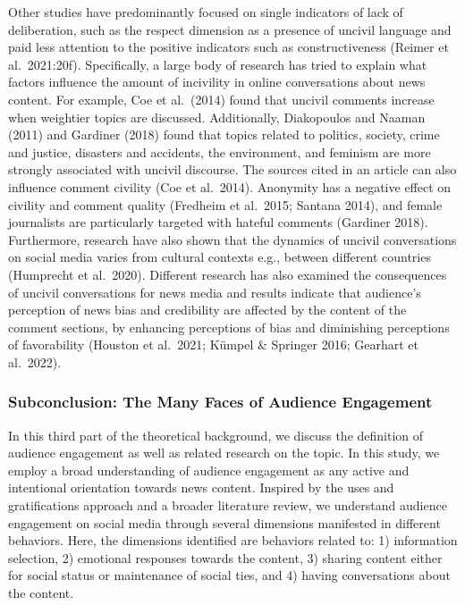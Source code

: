 \documentclass[
]{article}
\begin{document}
Other studies have predominantly focused on single indicators of lack of
deliberation, such as the respect dimension as a presence of uncivil
language and paid less attention to the positive indicators such as
constructiveness (Reimer et al.~2021:20f). Specifically, a large body of
research has tried to explain what factors influence the amount of
incivility in online conversations about news content. For example, Coe
et al.~(2014) found that uncivil comments increase when weightier topics
are discussed. Additionally, Diakopoulos and Naaman (2011) and Gardiner
(2018) found that topics related to politics, society, crime and
justice, disasters and accidents, the environment, and feminism are more
strongly associated with uncivil discourse. The sources cited in an
article can also influence comment civility (Coe et al.~2014). Anonymity
has a negative effect on civility and comment quality (Fredheim et
al.~2015; Santana 2014), and female journalists are particularly
targeted with hateful comments (Gardiner 2018). Furthermore, research
have also shown that the dynamics of uncivil conversations on social
media varies from cultural contexts e.g., between different countries
(Humprecht et al.~2020). Different research has also examined the
consequences of uncivil conversations for news media and results
indicate that audience's perception of news bias and credibility are
affected by the content of the comment sections, by enhancing
perceptions of bias and diminishing perceptions of favorability (Houston
et al.~2021; Kümpel \& Springer 2016; Gearhart et al.~2022).

\hypertarget{subconclusion-the-many-faces-of-audience-engagement}{%
\subsubsection{Subconclusion: The Many Faces of Audience
Engagement}\label{subconclusion-the-many-faces-of-audience-engagement}}

\noindent In this third part of the theoretical background, we discuss
the definition of audience engagement as well as related research on the
topic. In this study, we employ a broad understanding of audience
engagement as any active and intentional orientation towards news
content. Inspired by the uses and gratifications approach and a broader
literature review, we understand audience engagement on social media
through several dimensions manifested in different behaviors. Here, the
dimensions identified are behaviors related to: 1) information
selection, 2) emotional responses towards the content, 3) sharing
content either for social status or maintenance of social ties, and 4)
having conversations about the content.
\end{document}
